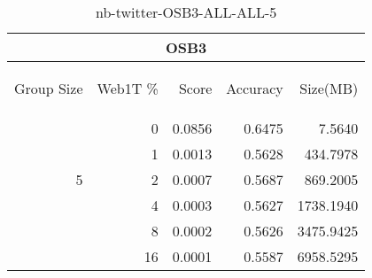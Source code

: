 \begin{center}
\begin{table}[htbp]
\begin{tabular}{ | r | r | r | r | r |}
\hline
\multicolumn{5}{|c|}{OSB3}\\
\hline
\begin{sideways}Group Size\end{sideways} & \begin{sideways}Web1T \%\end{sideways} & \begin{sideways}Score\end{sideways} & \begin{sideways}Accuracy\end{sideways} & \begin{sideways}Size(MB)\end{sideways}\\
\hline
\multirow{5}{*}{5}
 & 0 & 0.0856 & 0.6475 & 7.5640\\ \cline{2-5}
 & 1 & 0.0013 & 0.5628 & 434.7978\\ \cline{2-5}
 & 2 & 0.0007 & 0.5687 & 869.2005\\ \cline{2-5}
 & 4 & 0.0003 & 0.5627 & 1738.1940\\ \cline{2-5}
 & 8 & 0.0002 & 0.5626 & 3475.9425\\ \cline{2-5}
 & 16 & 0.0001 & 0.5587 & 6958.5295\\ \cline{2-5}
\hline
\end{tabular}
\caption{nb-twitter-OSB3-ALL-ALL-5}
\label{table:nb-twitter-OSB3-ALL-ALL-5}
\end{table}
\end{center}

